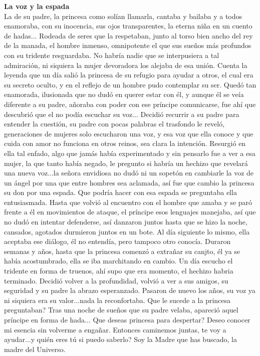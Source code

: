\documentclass[12pt, a4paper, twoside]{book} %
\begin{document}
\noindent\textbf{La voz y la espada}\\
La de su padre, la princesa como solían llamarla, cantaba y bailaba y a todos enamoraba, con su inocencia, sus ojos transparentes, la eterna niña en un cuento de hadas...
Rodeada de seres que la respetaban, junto al torso bien ancho del rey de la manada, el hombre inmenso, omnipotente el que sus sueños más profundos con su tridente resguardaba.
No habría nadie que se interpusiera a tal admiración, ni siquiera la mujer devoradora los alejaba de esa unión.
Cuenta la leyenda que un día salió la princesa de su refugio para ayudar a otros, el cual era su secreto oculto, y en el reflejo de un hombre pudo contemplar su ser.
Quedó tan enamorada, ilusionada que no dudó en querer estar con él, y aunque él se veía diferente a su padre, añoraba con poder con ese príncipe comunicarse, fue ahí que descubrió que el no podía escuchar su voz...
Decidió recurrir a su padre para entender la cuestión, su padre con pocas palabras el trasfondo le reveló, generaciones de mujeres solo escucharon una voz, y esa voz que ella conoce y que cuida con amor no funciona en otros reinos, sea clara la intención. Resurgió en ella tal enfado, algo que jamás había experimentado y sin pensarlo fue a ver a esa mujer, la que tanto había negado, le pregunto si habría un hechizo que revelará una nueva voz...la señora envidiosa no dudó ni un sopetón en cambiarle la voz de un ángel por una que entre hombres sea aclamada, así  fue que cambio la princesa su don por una espada.
Que podría hacer con esa espada se preguntaba ella entusiasmada.
Hasta que volvió al encuentro con el hombre que amaba y se paró frente a él en movimientos de ataque, el príncipe esos lenguajes manejaba, así que no dudó en intentar defenderse, así danzaron juntos hasta que se hizo la noche, cansados, agotados durmieron juntos en un bote.
Al día siguiente lo mismo, ella aceptaba ese diálogo, él no entendía, pero tampoco otro conocía.
Duraron semanas y años, hasta que la princesa comenzó a extrañar su canjto, él ya se había acostumbrado, ella se iba marchitando en cambio.
Un día escucho el tridente en forma de truenos, ahí supo que era momento, el hechizo habria terminado.
Decidió volver a la profundidad, volvió a ver a sus amigos, su seguridad y su padre la abrazo esperanzado.
Pasaron de nuevo los años, su voz ya ni siquiera era su valor...nada la reconfortaba.
Que le sucede a la princesa preguntaban?
Tras una noche de sueños que su padre velaba, apareció aquel príncipe en forma de  hada...
Que deseas princesa para despertar? Deseo conocer mi esencia sin volverme a engañar.
Entonces caminemos juntas, te voy a ayudar...y quién eres tú si puedo saberlo?
Soy la Madre que has buscado, la madre del Universo.
\end{document}
